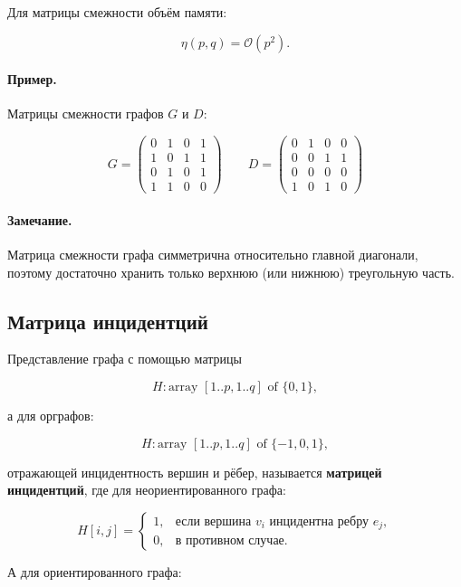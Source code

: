 {	Для матрицы смежности объём памяти:


	\[
	\eta(p, q) = \mathcal{O}(p^2).
	\]



	\paragraph{Пример.} Матрицы смежности графов $G$ и $D$:


	\[
	G =
	\begin{pmatrix}
	0 & 1 & 0 & 1 \\
	1 & 0 & 1 & 1 \\
	0 & 1 & 0 & 1 \\
	1 & 1 & 0 & 0
	\end{pmatrix}
	\qquad
	D =
	\begin{pmatrix}
	0 & 1 & 0 & 0 \\
	0 & 0 & 1 & 1 \\
	0 & 0 & 0 & 0 \\
	1 & 0 & 1 & 0
	\end{pmatrix}
	\]

	\paragraph{Замечание.}
Матрица смежности графа симметрична относительно главной диагонали, поэтому достаточно хранить только верхнюю (или нижнюю) треугольную часть.

\subsection*{Матрица инцидентций}

Представление графа с помощью матрицы


\[
H : \text{array } [1..p, 1..q] \text{ of } \{0, 1\},
\]


а для орграфов:


\[
H : \text{array } [1..p, 1..q] \text{ of } \{-1, 0, 1\},
\]


отражающей инцидентность вершин и рёбер, называется \textbf{матрицей инцидентций}, где для неориентированного графа:


\[
H[i, j] =
\begin{cases}
1, & \text{если вершина } v_i \text{ инцидентна ребру } e_j, \\
0, & \text{в противном случае}.
\end{cases}
\]



А для ориентированного графа:


}
